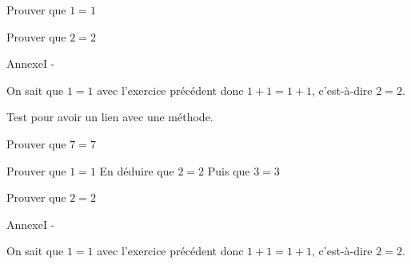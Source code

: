 \documentclass[nocrop]{sesamanuel}
\begin{document}
\exercicesbase
\begin{colonne*exercice}
  \begin{exercice}
  Prouver que $1=1$
  \end{exercice}
  \begin{exercice*}
  Prouver que $2=2$
  \end{exercice*}
  \begin{corrige}
  AnnexeI -

  On sait que $1=1$ avec l’exercice précédent donc $1+1=1+1$,
  c’est-à-dire $2=2$.
  \end{corrige}
  \begin{exercice}
  \label{exo-exemple3}
  Test pour avoir un lien avec une méthode.
  \end{exercice}
  \begin{exercice}
    Prouver que $7=7$
  \end{exercice}

  \begin{exercice}
    \partie
    Prouver que $1=1$
    \partie
    En déduire que $2=2$
    \partie 
    Puis que $3=3$
  \end{exercice}
  \begin{exercice*}
  Prouver que $2=2$
  \end{exercice*}
  \begin{corrige}
    AnnexeI -

  On sait que $1=1$ avec l’exercice précédent donc $1+1=1+1$,
  c’est-à-dire $2=2$.
  \end{corrige}
\end{colonne*exercice}
\end{document}
